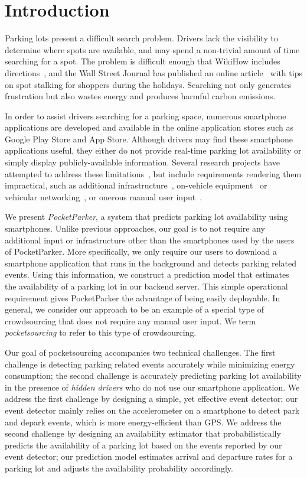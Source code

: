 \section{Introduction}

Parking lots present a difficult search problem. Drivers lack the visibility
to determine where spots are available, and may spend a non-trivial amount of
time searching for a spot. The problem is difficult enough that WikiHow
includes directions~\cite{wikihow-park}, and the Wall Street Journal has
published an online article~\cite{wsj-park} with tips on spot stalking for
shoppers during the holidays. Searching not only generates frustration but
also wastes energy and produces harmful carbon emissions.

In order to assist drivers searching for a parking space, numerous smartphone
applications are developed and available in the online application stores
such as Google Play Store and App Store. Although drivers may find these
smartphone applications useful, they either do not provide real-time parking
lot availability or simply display publicly-available information. Several
research projects have attempted to address these limitations~\cite{4212497,
Chen:2012:COS, Delot:2009:CRP, 5062057, Mathur:2010:PDS}, but include
requirements rendering them impractical, such as additional
infrastructure~\cite{5062057}, on-vehicle equipment~\cite{Mathur:2010:PDS} or
vehicular networking~\cite{Delot:2009:CRP, Mathur:2010:PDS}, or onerous
manual user input~\cite{Chen:2012:COS}.

We present {\it PocketParker}, a system that predicts parking lot availability
using smartphones. Unlike previous approaches, our goal is to not require any
additional input or infrastructure other than the smartphones used by the users
of PocketParker. More specifically, we only require our users to download a
smartphone application that runs in the background and detects parking related
events. Using this information, we construct a prediction model that estimates
the availability of a parking lot in our backend server. This simple operational
requirement gives PocketParker the advantage of being easily deployable. In
general, we consider our approach to be an example of a special type of
crowdsourcing that does not require any manual user input. We term {\it
pocketsourcing} to refer to this type of crowdsourcing.

Our goal of pocketsourcing accompanies two technical challenges. The first
challenge is detecting parking related events accurately while minimizing energy
consumption; the second challenge is accurately predicting parking lot
availability in the presence of {\it hidden drivers} who do not use our
smartphone application. We address the first challenge by designing a simple,
yet effective event detector; our event detector mainly relies on the
accelerometer on a smartphone to detect park and depark events, which is more
energy-efficient than GPS. We address the second challenge by designing an
availability estimator that probabilistically predicts the availability of a
parking lot based on the events reported by our event detector; our prediction
model estimates arrival and departure rates for a parking lot and adjusts the
availability probability accordingly.

